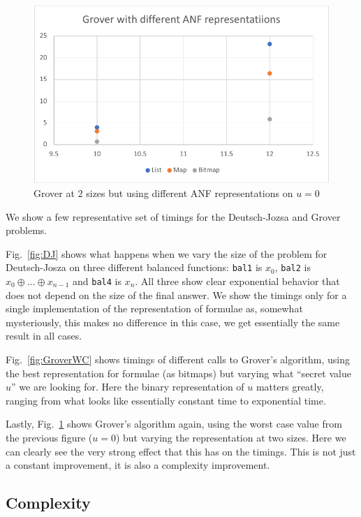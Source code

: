 \documentclass[sigplan,screen]{acmart}
\theoremstyle{definition}
\begin{document}
\begin{figure}
\includegraphics[scale=0.6]{../execution/RetroPE/Grover1.pdf}
  \caption{\label{fig:GroverImpl} Grover at $2$ sizes but using different ANF representations on $u=0$}
\end{figure}

We show a few representative set of timings for the Deutsch-Jozsa and
Grover problems.

Fig.~\ref{fig:DJ} shows what happens when we vary the
size of the problem for Deutsch-Josza on three different balanced
functions: \texttt{bal1} is $x_0$, \texttt{bal2} is $x_0\oplus\ldots\oplus x_{n-1}$
and \texttt{bal4} is $x_n$. All three show
clear exponential behavior that does not depend on the size of the final
answer. We show the timings only for a single implementation of the
representation of formulae as, somewhat mysteriously, this makes no
difference in this case, we get essentially the same result in all cases.

Fig.~\ref{fig:GroverWC} shows timings of different calls to Grover's
algorithm, using the best representation for formulae (as bitmaps) but varying
what ``secret value $u$'' we are looking for. Here
the binary representation of $u$ matters greatly, ranging from what looks
like essentially constant time to exponential time.

Lastly, Fig.~\ref{fig:GroverImpl} shows Grover's algorithm again, using the
worst case value from the previous figure ($u=0$) but varying the representation
at two sizes. Here we can clearly see the very strong effect that this has
on the timings. This is not just a constant improvement, it is also a complexity
improvement.

\subsection{Complexity}
\label{sub:complexity}
\end{document}
